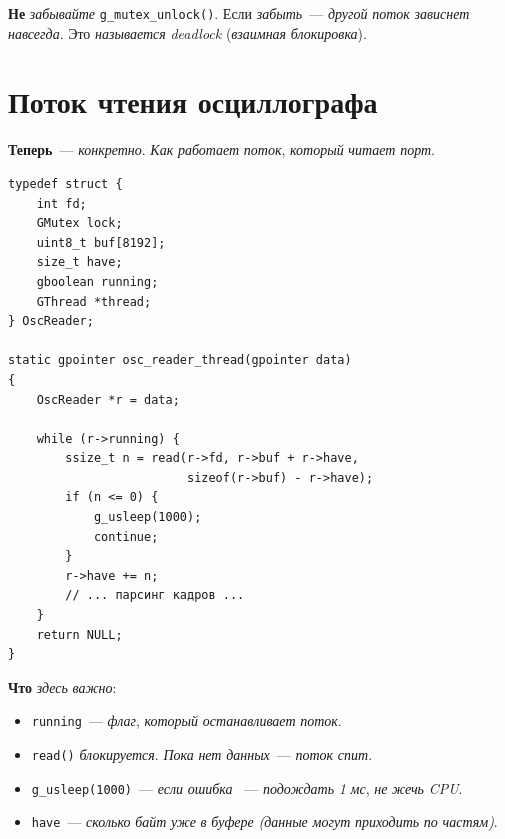 \begin{warnbox}
\textbf{Не} \emph{забывайте} \texttt{g\_mutex\_unlock()}. Если
\emph{забыть}~--- \emph{другой} \emph{поток} \emph{зависнет}
\emph{навсегда}. Это \emph{называется} \emph{deadlock}
(\emph{взаимная} \emph{блокировка}).
\end{warnbox}

\section{Поток чтения осциллографа}
\label{sec:pc-reader}

\textbf{Теперь}~--- \emph{конкретно}. \emph{Как} \emph{работает}
\emph{поток}, \emph{который} \emph{читает} \emph{порт}.

\begin{listing}[htbp]
\begin{verbatim}
typedef struct {
    int fd;
    GMutex lock;
    uint8_t buf[8192];
    size_t have;
    gboolean running;
    GThread *thread;
} OscReader;

static gpointer osc_reader_thread(gpointer data)
{
    OscReader *r = data;

    while (r->running) {
        ssize_t n = read(r->fd, r->buf + r->have,
                         sizeof(r->buf) - r->have);
        if (n <= 0) {
            g_usleep(1000);
            continue;
        }
        r->have += n;
        // ... парсинг кадров ...
    }
    return NULL;
}
\end{verbatim}
\caption{\texttt{osc\_reader\_thread()}: поток чтения}
\label{lst:pc-reader}
\end{listing}

\textbf{Что} \emph{здесь} \emph{важно}:
\begin{itemize}
    \item \texttt{running}~--- \emph{флаг}, \emph{который}
          \emph{останавливает} \emph{поток}.
    \item \texttt{read()} \emph{блокируется}. \emph{Пока} \emph{нет}
          \emph{данных}~--- \emph{поток} \emph{спит}.
    \item \texttt{g\_usleep(1000)}~--- \emph{если} \emph{ошибка}~
          --- \emph{подождать} \emph{1} \emph{мс}, \emph{не}
          \emph{жечь} \emph{CPU}.
    \item \texttt{have}~--- \emph{сколько} \emph{байт} \emph{уже}
          \emph{в} \emph{буфере} \emph{(данные} \emph{могут}
          \emph{приходить} \emph{по} \emph{частям)}.
\end{itemize}

